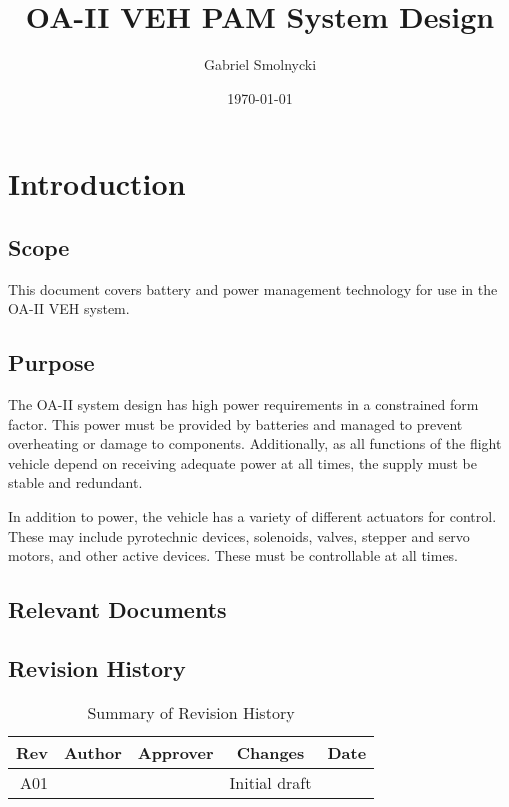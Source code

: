 \documentclass[12pt,article]{memoir}
\title{OA-II VEH PAM System Design}
\author{Gabriel Smolnycki}
\date{\today}
\begin{document}
	


\tableofcontents*
\clearpage


\chapter{Introduction}
\section{Scope}
This document covers battery and power management technology for use in the OA-II VEH system. 

\section{Purpose}
The OA-II system design has high power requirements in a constrained form factor. This power must be provided by batteries and managed to prevent overheating or damage to components. Additionally, as all functions of the flight vehicle depend on receiving adequate power at all times, the supply must be stable and redundant.\par
In addition to power, the vehicle has a variety of different actuators for control. These may include pyrotechnic devices, solenoids, valves, stepper and servo motors, and other active devices. These must be controllable at all times.

\section{Relevant Documents}

\section{Revision History}
\begin{table}[H]
	\centering
	\begin{tabu}{r || c | c | c | c }
		Rev & Author & Approver & Changes & Date\\ \hline
		A01 & & & Initial draft & \\
	\end{tabu}
	\caption{Summary of Revision History}
	\label{tab:rev}
\end{table}

\newpage
\end{document}
